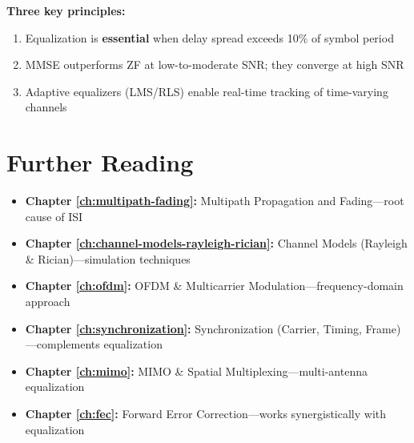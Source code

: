 \begin{keyconcept}
\textbf{Three key principles:}
\begin{enumerate}
\item Equalization is \textbf{essential} when delay spread exceeds 10\% of symbol period
\item MMSE outperforms ZF at low-to-moderate SNR; they converge at high SNR
\item Adaptive equalizers (LMS/RLS) enable real-time tracking of time-varying channels
\end{enumerate}
\end{keyconcept}

\section{Further Reading}

\begin{itemize}
\item \textbf{Chapter \ref{ch:multipath-fading}:} Multipath Propagation and Fading---root cause of ISI
\item \textbf{Chapter \ref{ch:channel-models-rayleigh-rician}:} Channel Models (Rayleigh \& Rician)---simulation techniques
\item \textbf{Chapter \ref{ch:ofdm}:} OFDM \& Multicarrier Modulation---frequency-domain approach
\item \textbf{Chapter \ref{ch:synchronization}:} Synchronization (Carrier, Timing, Frame)---complements equalization
\item \textbf{Chapter \ref{ch:mimo}:} MIMO \& Spatial Multiplexing---multi-antenna equalization
\item \textbf{Chapter \ref{ch:fec}:} Forward Error Correction---works synergistically with equalization
\end{itemize}
